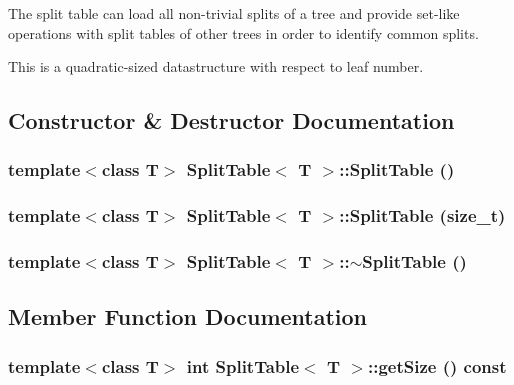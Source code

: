 The split table can load all non-trivial splits of a tree and provide set-like operations with split tables of other trees in order to identify common splits. 

This is a quadratic-sized datastructure with respect to leaf number. 



\subsection{Constructor \& Destructor Documentation}
\subsubsection{\setlength{\rightskip}{0pt plus 5cm}template$<$class T$>$ {\bf Split\-Table}$<$ T $>$::{\bf Split\-Table} ()}\label{classSplitTable_a0}


\subsubsection{\setlength{\rightskip}{0pt plus 5cm}template$<$class T$>$ {\bf Split\-Table}$<$ T $>$::{\bf Split\-Table} (size\_\-t)}\label{classSplitTable_a1}


\subsubsection{\setlength{\rightskip}{0pt plus 5cm}template$<$class T$>$ {\bf Split\-Table}$<$ T $>$::$\sim${\bf Split\-Table} ()}\label{classSplitTable_a2}




\subsection{Member Function Documentation}
\subsubsection{\setlength{\rightskip}{0pt plus 5cm}template$<$class T$>$ int {\bf Split\-Table}$<$ T $>$::get\-Size () const}\label{classSplitTable_a4}


